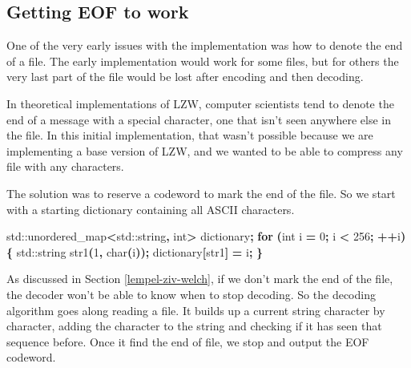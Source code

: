 \documentclass[12pt,twoside]{reedthesis}
\newenvironment{Shaded}{\begin{snugshade}}{\end{snugshade}}
\newcommand{\BuiltInTok}[1]{#1}
\newcommand{\ControlFlowTok}[1]{\textcolor[rgb]{0.13,0.29,0.53}{\textbf{#1}}}
\newcommand{\DataTypeTok}[1]{\textcolor[rgb]{0.13,0.29,0.53}{#1}}
\newcommand{\DecValTok}[1]{\textcolor[rgb]{0.00,0.00,0.81}{#1}}
\newcommand{\NormalTok}[1]{#1}
\newcommand{\OperatorTok}[1]{\textcolor[rgb]{0.81,0.36,0.00}{\textbf{#1}}}
\begin{document}
\hypertarget{getting-eof-to-work}{%
\subsection{Getting EOF to work}\label{getting-eof-to-work}}

One of the very early issues with the implementation was how to denote the end of a file. The early implementation would work for some files, but for others the very last part of the file would be lost after encoding and then decoding.

In theoretical implementations of LZW, computer scientists tend to denote the end of a message with a special character, one that isn't seen anywhere else in the file. In this initial implementation, that wasn't possible because we are implementing a base version of LZW, and we wanted to be able to compress any file with any characters.

The solution was to reserve a codeword to mark the end of the file. So we start with a starting dictionary containing all ASCII characters.
\begin{Shaded}
\begin{Highlighting}[]
    \BuiltInTok{std::}\NormalTok{unordered\_map}\OperatorTok{\textless{}}\BuiltInTok{std::}\NormalTok{string}\OperatorTok{,} \DataTypeTok{int}\OperatorTok{\textgreater{}}\NormalTok{ dictionary}\OperatorTok{;}
    \ControlFlowTok{for} \OperatorTok{(}\DataTypeTok{int}\NormalTok{ i }\OperatorTok{=} \DecValTok{0}\OperatorTok{;}\NormalTok{ i }\OperatorTok{\textless{}} \DecValTok{256}\OperatorTok{;} \OperatorTok{++}\NormalTok{i}\OperatorTok{)\{}
        \BuiltInTok{std::}\NormalTok{string}\OperatorTok{ }\NormalTok{str1}\OperatorTok{(}\DecValTok{1}\OperatorTok{,} \DataTypeTok{char}\OperatorTok{(}\NormalTok{i}\OperatorTok{));}
\NormalTok{        dictionary}\OperatorTok{[}\NormalTok{str1}\OperatorTok{]} \OperatorTok{=}\NormalTok{ i}\OperatorTok{;}
    \OperatorTok{\}}
\end{Highlighting}
\end{Shaded}
As discussed in Section \ref{lempel-ziv-welch}, if we don't mark the end of the file, the decoder won't be able to know when to stop decoding. So the decoding algorithm goes along reading a file. It builds up a current string character by character, adding the character to the string and checking if it has seen that sequence before. Once it find the end of file, we stop and output the EOF codeword.
\end{document}
